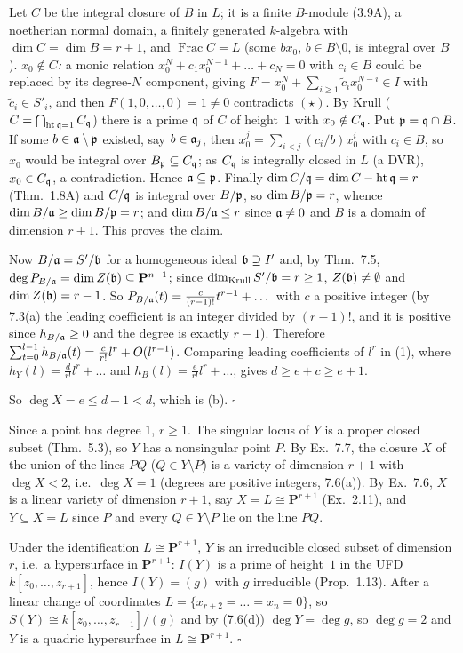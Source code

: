 \documentclass[11pt]{article}
\begin{document}
Let $C$ be the integral closure of $B$ in $L$; it is a finite $B$-module (3.9A), a noetherian normal domain, a finitely generated $k$-algebra with $\dim C=\dim B=r+1$, and $\operatorname{Frac}C=L$ (some $bx_0$, $b\in B\setminus0$, is integral over $B$). \emph{$x_0\notin C$:} a monic relation $x_0^N+c_1x_0^{N-1}+\dots+c_N=0$ with $c_i\in B$ could be replaced by its degree-$N$ component, giving $F=x_0^N+\sum_{i\ge1}\tilde c_ix_0^{N-i}\in I$ with $\tilde c_i\in S'_i$, and then $F(1,0,\dots,0)=1\ne0$ contradicts $(\star)$. By Krull ($C=\bigcap_{\operatorname{ht}\mathfrak q=1}C_\mathfrak q$) there is a prime $\mathfrak q$ of $C$ of height~$1$ with $x_0\notin C_\mathfrak q$. Put $\mathfrak p=\mathfrak q\cap B$. If some $b\in\mathfrak a\setminus\mathfrak p$ existed, say $b\in\mathfrak a_j$, then $x_0^j=\sum_{i<j}(c_i/b)x_0^i$ with $c_i\in B$, so $x_0$ would be integral over $B_\mathfrak p\subseteq C_\mathfrak q$; as $C_\mathfrak q$ is integrally closed in $L$ (a DVR), $x_0\in C_\mathfrak q$, a contradiction. Hence $\mathfrak a\subseteq\mathfrak p$. Finally $\dim C/\mathfrak q=\dim C-\operatorname{ht}\mathfrak q=r$ (Thm.~1.8A) and $C/\mathfrak q$ is integral over $B/\mathfrak p$, so $\dim B/\mathfrak p=r$, whence $\dim B/\mathfrak a\ge\dim B/\mathfrak p=r$; and $\dim B/\mathfrak a\le r$ since $\mathfrak a\ne0$ and $B$ is a domain of dimension $r+1$. This proves the claim.

Now $B/\mathfrak a=S'/\mathfrak b$ for a homogeneous ideal $\mathfrak b\supseteq I'$ and, by Thm.~7.5, $\deg P_{B/\mathfrak a}=\dim Z(\mathfrak b)\subseteq\mathbf P^{n-1}$; since $\dim_{\rm Krull}S'/\mathfrak b=r\ge1$, $Z(\mathfrak b)\neq\emptyset$ and $\dim Z(\mathfrak b)=r-1$. So $P_{B/\mathfrak a}(t)=\frac{c}{(r-1)!}t^{r-1}+\dots$ with $c$ a positive integer (by 7.3(a) the leading coefficient is an integer divided by $(r-1)!$, and it is positive since $h_{B/\mathfrak a}\ge0$ and the degree is exactly $r-1$). Therefore $\sum_{t=0}^{l-1}h_{B/\mathfrak a}(t)=\frac{c}{r!}l^r+O(l^{r-1})$. Comparing leading coefficients of $l^r$ in (1), where $h_Y(l)=\frac d{r!}l^r+\dots$ and $h_B(l)=\frac e{r!}l^r+\dots$, gives $d\ge e+c\ge e+1$.

So $\deg X=e\le d-1<d$, which is (b). \hfill$\square$

\pf
Since a point has degree $1$, $r\ge1$. The singular locus of $Y$ is a proper closed subset (Thm.~5.3), so $Y$ has a nonsingular point $P$. By Ex.~7.7, the closure $X$ of the union of the lines $PQ$ ($Q\in Y\setminus P$) is a variety of dimension $r+1$ with $\deg X<2$, i.e.\ $\deg X=1$ (degrees are positive integers, 7.6(a)). By Ex.~7.6, $X$ is a linear variety of dimension $r+1$, say $X=L\cong\mathbf P^{r+1}$ (Ex.~2.11), and $Y\subseteq X=L$ since $P$ and every $Q\in Y\setminus P$ lie on the line $PQ$.

Under the identification $L\cong\mathbf P^{r+1}$, $Y$ is an irreducible closed subset of dimension $r$, i.e.\ a hypersurface in $\mathbf P^{r+1}$: $I(Y)$ is a prime of height~$1$ in the UFD $k[z_0,\dots,z_{r+1}]$, hence $I(Y)=(g)$ with $g$ irreducible (Prop.~1.13). After a linear change of coordinates $L=\{x_{r+2}=\dots=x_n=0\}$, so $S(Y)\cong k[z_0,\dots,z_{r+1}]/(g)$ and by (7.6(d)) $\deg Y=\deg g$, so $\deg g=2$ and $Y$ is a quadric hypersurface in $L\cong\mathbf P^{r+1}$. \hfill$\square$
\end{document}
